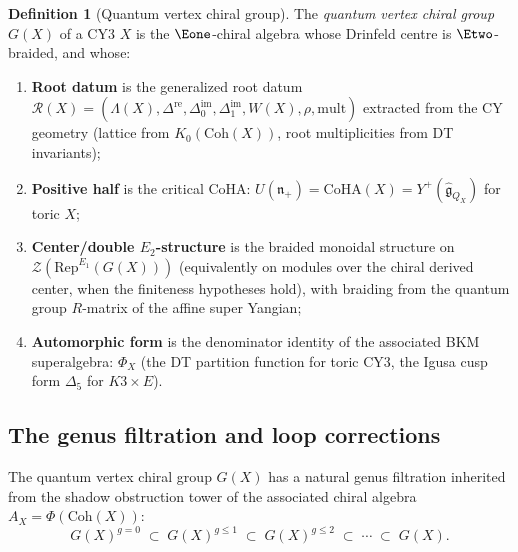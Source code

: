 \documentclass[11pt]{article}
\theoremstyle{definition}
\newtheorem{definition}[theorem]{Definition}
\theoremstyle{remark}
\newcommand{\cZ}{\mathcal{Z}}
\newcommand{\frakg}{\mathfrak{g}}
\newcommand{\Rep}{\mathrm{Rep}}
\newcommand{\Coh}{\mathrm{Coh}}
\newcommand{\CoHA}{\mathrm{CoHA}}
\begin{document}
\begin{definition}[Quantum vertex chiral group]
The \emph{quantum vertex chiral group} $G(X)$ of a CY3 $X$ is the
$\Eone$-chiral algebra whose Drinfeld centre is $\Etwo$-braided, and
whose:
\begin{enumerate}[label=(\roman*)]
\item \textbf{Root datum} is the generalized root datum
 $\mathcal{R}(X) = (\Lambda(X), \Delta^{\mathrm{re}},
 \Delta^{\mathrm{im}}_0, \Delta^{\mathrm{im}}_1, W(X), \rho,
 \mathrm{mult})$ extracted from the CY geometry (lattice from
 $K_0(\Coh(X))$, root multiplicities from DT invariants);
\item \textbf{Positive half} is the critical CoHA:
 $U(\mathfrak{n}_+) = \CoHA(X) = Y^+(\widehat{\frakg}_{Q_X})$
 for toric $X$;
\item \textbf{Center/double $E_2$-structure} is the braided monoidal
 structure on $\cZ(\Rep^{E_1}(G(X)))$ (equivalently on modules over
 the chiral derived center, when the finiteness hypotheses hold), with
 braiding from the quantum group $R$-matrix of the affine super Yangian;
\item \textbf{Automorphic form} is the denominator identity of the
 associated BKM superalgebra: $\Phi_X$ (the DT partition function
 for toric CY3, the Igusa cusp form $\Delta_5$ for $K3 \times E$).
\end{enumerate}
\end{definition}

\subsection{The genus filtration and loop corrections}

The quantum vertex chiral group $G(X)$ has a natural genus
filtration inherited from the shadow obstruction tower of the
associated chiral algebra $A_X = \Phi(\Coh(X))$:
\begin{equation}\label{eq:genus-filtration}
G(X)^{g=0} \;\subset\; G(X)^{g \leq 1} \;\subset\;
G(X)^{g \leq 2} \;\subset\; \cdots \;\subset\; G(X).
\end{equation}
\end{document}
